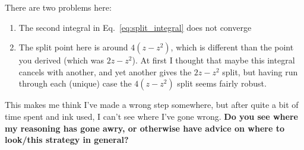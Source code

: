 \documentclass[11pt,twoside,reqno]{amsart}
\theoremstyle{plain}
\theoremstyle{remark}
\theoremstyle{definition}
\theoremstyle{remark}
\theoremstyle{definition}
\theoremstyle{definition}
\begin{document}
There are two problems here:
\begin{enumerate}
	\item The second integral in Eq.\ \ref{eq:split_integral} does not converge

	\item The split point here is around $4(z - z^2)$, which is different than the point you derived (which was $2z - z^2$). At first I thought that maybe this integral cancels with another, and yet another gives the $2z - z^2$ split, but having run through each (unique) case the $4(z - z^2)$ split seems fairly robust.
\end{enumerate}
This makes me think I've made a wrong step somewhere, but after quite a bit of time spent and ink used, I can't see where I've gone wrong. \textbf{Do you see where my reasoning has gone awry, or otherwise have advice on where to look/this strategy in general?}
\end{document}
